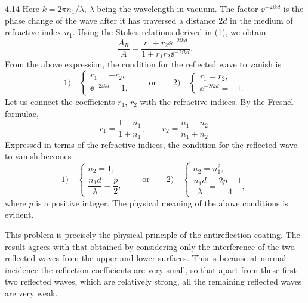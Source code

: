 \begin{solution}{4.14}
Here $k = 2\pi n_1/\lambda$, $\lambda$ being the wavelength in vacuum. The factor
$\ee^{-2\ii kd}$ is the phase change of the wave after it has traversed a distance $2d$ in the
medium of refractive index $n_1$. Using the Stokes relations derived in (1), we obtain
\begin{equation*}
\frac{A_R}{A} = \frac{r_1 + r_2\ee^{-2\ii kd}}{1 + r_1r_2\ee^{-2\ii kd}} .
\end{equation*}
From the above expression, the condition for the reflected wave to vanish is
\begin{equation*}
\text{1)}\quad
\begin{cases}
r_1 = -r_2,\\
\ee^{-2\ii kd} = 1,
\end{cases}
\qquad\text{or}\qquad
\text{2)}\quad
\begin{cases}
r_1 = r_2,\\
\ee^{-2\ii kd} = -1.
\end{cases}
\end{equation*}
Let us connect the coefficients $r_1$, $r_2$ with the refractive indices. By the Fresnel
formulae,
\begin{equation*}
r_1 = \frac{1-n_1}{1+n_1},\qquad
r_2 = \frac{n_1-n_2}{n_1+n_2}.
\end{equation*}
Expressed in terms of the refractive indices, the condition for the reflected wave to vanish
becomes
\begin{equation*}
\text{1)}\quad
\begin{cases}
n_2 = 1,\\[2pt]
\dfrac{n_1d}{\lambda} = \dfrac{p}{2},
\end{cases}
\qquad\text{or}\qquad
\text{2)}\quad
\begin{cases}
n_2 = n_1^2,\\[2pt]
\dfrac{n_1d}{\lambda} = \dfrac{2p-1}{4},
\end{cases}
\end{equation*}
where $p$ is a positive integer. The physical meaning of the above conditions is evident.

\begin{commentary}
This problem is precisely the physical principle of the antireflection coating. The result agrees
with that obtained by considering only the interference of the two reflected waves from the upper
and lower surfaces. This is because at normal incidence the reflection coefficients are very
small, so that apart from these first two reflected waves, which are relatively strong, all the
remaining reflected waves are very weak.
\end{commentary}
\end{solution}

